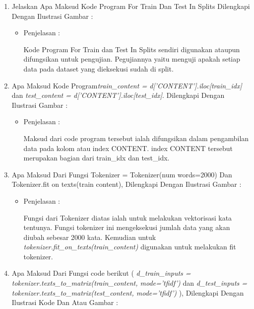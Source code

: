 \begin{enumerate}
\begin{itemize}
\end{itemize}
\par
\par
\par
\item Jelaskan Apa Maksud Kode Program For Train Dan Test In Splits Dilengkapi Dengan Ilustrasi Gambar :
\begin{itemize}
\item Penjelasan	:
\par Kode Program For Train dan Test In Splits sendiri digunakan ataupun difungsikan untuk pengujian. Pegujiannya yaitu menguji apakah setiap data pada dataset yang dieksekusi sudah di split.
\par 
\par
\end{itemize}
\par
\item Apa Maksud Kode Program\emph{train\_content = d['CONTENT'].iloc[train\_idx]} dan \emph{test\_content = d['CONTENT'].iloc[test\_idx]}. Dilengkapi Dengan Ilustrasi Gambar :
\begin{itemize}
\item Penjelasan	:
\par Maksud dari code program tersebut ialah difungsikan dalam pengambilan data pada kolom atau index CONTENT. index CONTENT tersebut merupakan bagian dari train\_idx dan test\_idx.
\par
\par
\end{itemize}
\par
\item Apa Maksud Dari Fungsi Tokenizer = Tokenizer(num words=2000) Dan Tokenizer.fit on texts(train content), Dilengkapi Dengan Ilustrasi Gambar :
\begin{itemize}
\item Penjelasan	:
\par  Fungsi dari Tokenizer diatas ialah untuk melakukan vektorisasi kata tentunya. Fungsi tokenizer ini mengeksekusi jumlah data yang akan diubah sebesar 2000 kata. Kemudian untuk  \emph{tokenizer.fit\_on\_texts(train\_content)} digunakan untuk melakukan fit tokenizer.
\par
\par
\end{itemize}
\par
\item Apa Maksud Dari Fungsi code berikut ( \emph{d\_train\_inputs = tokenizer.texts\_to\_matrix(train\_content, mode='tfidf')} dan \emph{d\_test\_inputs = tokenizer.texts\_to\_matrix(test\_content, mode='tfidf')} ), Dilengkapi Dengan Ilustrasi Kode Dan Atau Gambar :

\end{enumerate}
